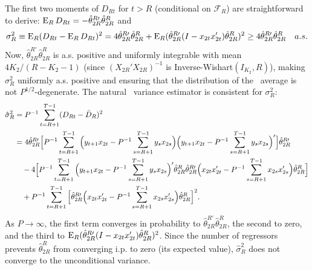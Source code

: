 \documentclass[11pt]{article}
\begin{document}
The first two moments of $D_{Rt}$ for $t > R$ (conditional
on $\mathcal{F}_R$) are straightforward to derive:
$\operatorname{E}_R D_{Rt} = - \hat{\theta}_{2R}^{R\prime} \hat{\theta}_{2R}^R$
and
\begin{equation*}
  \sigma_R^2 \equiv \operatorname{E}_R(D_{Rt} - \operatorname{E}_R D_{Rt})^2 = 4
  \hat{\theta}_{2R}^{R\prime} \hat{\theta}_{2R}^{R} +
  \operatorname{E}_R(\hat{\theta}_{2R}^{R\prime} (I - x_{2t} x_{2t}')
  \hat{\theta}_{2R}^{R})^2   \geq 4 \hat{\theta}_{2R}^{R\prime}
  \hat{\theta}_{2R}^R \quad a.s.
\end{equation*}
Now, $\hat{\theta}_{2R}^{R\prime} \hat{\theta}_{2R}^R$ is
a.s. positive and uniformly integrable with mean $4 K_2 / (R - K_2 -
1)$ (since $(X_{2R}'X_{2R})^{-1}$ is Inverse-Wishart$(I_{K_2}, R)$),
making $\sigma_R^2$ uniformly a.s. positive and ensuring that the
distribution of the \oos\ average is not $P^{1/2}$-degenerate.  The
natural \oos\ variance estimator is consistent for $\sigma_R^2$:
\begin{align*}
  \hat{\sigma}_R^2 &= P^{-1} \sum_{t=R+1}^{T-1} (D_{Rt} - \bar{D}_{R})^2 \\
  &= 4 \hat{\theta}_{2R}^{R\prime} \Big[P^{-1} \sum_{t=R+1}^{T-1}
  \Big(y_{t+1} x_{2t} - P^{-1} \sum_{s=R+1}^{T-1} y_s x_{2s}\Big)
  \Big(y_{t+1} x_{2t} - P^{-1} \sum_{s=R+1}^{T-1} y_s
  x_{2s}\Big)'\Big] \hat{\theta}_{2R}^{R\prime} \\ & \quad - 4
  \Big[P^{-1} \sum_{t=R+1}^{T-1} \Big(y_{t+1} x_{2t} - P^{-1}
  \sum_{s=R+1}^{T-1} y_s x_{2s}\Big)' \hat{\theta}_{2R}^{R}
  \hat{\theta}_{2R}^{R\prime} \Big(x_{2t} x_{2t}' - P^{-1}
  \sum_{s=R+1}^{T-1} x_{2s} x_{2s}' \Big) \hat{\theta}_{2R}^{R} \Big]
  \\ &\quad + P^{-1} \sum_{t=R+1}^{T-1}
  \Big[\hat{\theta}_{2R}^{R\prime} \Big(x_{2t} x_{2t}' - P^{-1}
  \sum_{s=R+1}^{T-1} x_{2s} x_{2s}' \Big) \hat{\theta}_{2R}^{R}  \Big]^{2}.
\end{align*}
As $P \to \infty$, the first term converges in probability to
$\hat{\theta}_{2R}^{R\prime} \hat{\theta}_{2R}^R$, the second to zero,
and the third to $\operatorname{E}_R(\hat{\theta}_{2R}^{R\prime}(I - x_{2t}x_{2t}')
\hat{\theta}_{2R}^R)^2$.  Since the number of regressors prevents
$\hat{\theta}_{2R}^R$ from converging i.p. to zero (its expected
value), $\hat{\sigma}_R^2$ does not converge to the unconditional
variance.
\end{document}
